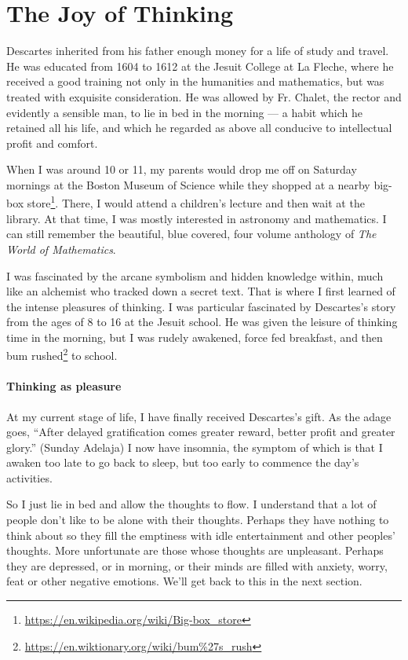 \section{The Joy of Thinking}

\begin{quotex}
Descartes inherited from his father enough money for a life of study and travel. He was educated from 1604 to 1612 at the Jesuit College at La Fleche, where he received a good training not only in the humanities and mathematics, but was treated with exquisite consideration. He was allowed by Fr. Chalet, the rector and evidently a sensible man, to lie in bed in the morning --- a habit which he retained all his life, and which he regarded as above all conducive to intellectual profit and comfort.
\end{quotex}


When I was around 10 or 11, my parents would drop me off on Saturday mornings at the Boston Museum of Science while they shopped at a nearby big-box store\footnote{\url{https://en.wikipedia.org/wiki/Big-box_store}}. There, I would attend a children's lecture and then wait at the library. At that time, I was mostly interested in astronomy and mathematics. I can still remember the beautiful, blue covered, four volume anthology of \emph{The World of Mathematics}.


I was fascinated by the arcane symbolism and hidden knowledge within, much like an alchemist who tracked down a secret text. That is where I first learned of the intense pleasures of thinking. I was particular fascinated by Descartes's story from the ages of 8 to 16 at the Jesuit school. He was given the leisure of thinking time in the morning, but I was rudely awakened, force fed breakfast, and then bum rushed\footnote{\url{https://en.wiktionary.org/wiki/bum\%27s_rush}} to school.

\paragraph{Thinking as pleasure}


At my current stage of life, I have finally received Descartes's gift. As the adage goes, ``After delayed gratification comes greater reward, better profit and greater glory.'' (Sunday Adelaja) I now have insomnia, the symptom of which is that I awaken too late to go back to sleep, but too early to commence the day's activities.

So I just lie in bed and allow the thoughts to flow. I understand that a lot of people don't like to be alone with their thoughts. Perhaps they have nothing to think about so they fill the emptiness with idle entertainment and other peoples' thoughts. More unfortunate are those whose thoughts are unpleasant. Perhaps they are depressed, or in morning, or their minds are filled with anxiety, worry, feat or other negative emotions. We'll get back to this in the next section.

